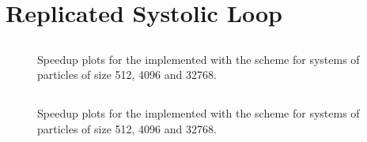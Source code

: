 \section{Replicated Systolic Loop}

\subsection{\individualoperation{}}

%
%
\begin{figure}[!h]
    
    \caption{
        Speedup plots for the \individualoperation{} implemented with the \replicatedsystolicloop{} scheme for systems of particles of size 512, 4096 and 32768.
    }
    \label{fig:v1_replicated_systolic_loop_individual_operation_speedups}
\end{figure}


%
%
\begin{figure}[!h]
    
    \caption{}
    \label{fig:v1_replicated_systolic_individual_operation_512_time}
\end  {figure}

\begin{figure}[!h]
    
    \caption{}
    \label{fig:v1_replicated_systolic_individual_operation_4096_time}
\end  {figure}

\begin{figure}[!h]
    
    \caption{}
    \label{fig:v1_replicated_systolic_individual_operation_32768_time}
\end  {figure}




\subsection{\pairoperation{}}

%
%
\begin{figure}[!h]
    
    \caption{
        Speedup plots for the \pairoperation{} implemented with the \replicatedsystolicloop{} scheme for systems of particles of size 512, 4096 and 32768.
    }
    \label{fig:v1_replicated_systolic_pair_operation_speedups}
\end{figure}


